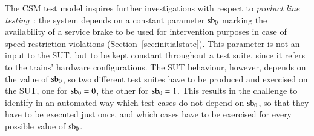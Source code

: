 The CSM test model inspires further investigations with respect to {\it product line testing}~\cite{DBLP:conf/icsoft/LamanchaUV09}: the system depends on a constant parameter $\text{sb}_0$ marking the
availability of a service brake to be used for intervention purposes in case of speed restriction violations (Section~\ref{sec:initialstate}). This parameter is not an input to the SUT, but to be kept  constant throughout a test suite, since it refers to the trains' hardware configurations. The SUT behaviour, however, 
depends on the value of  $\text{sb}_0$, so two different test suites have to be produced and exercised on the SUT, one for $\text{sb}_0 = 0$, the other for $\text{sb}_0 = 1$. This results in the challenge to identify in an automated way which test cases do not depend on $\text{sb}_0$, so that they have to be executed just once, and which cases have to be exercised for every possible value of $\text{sb}_0$.
